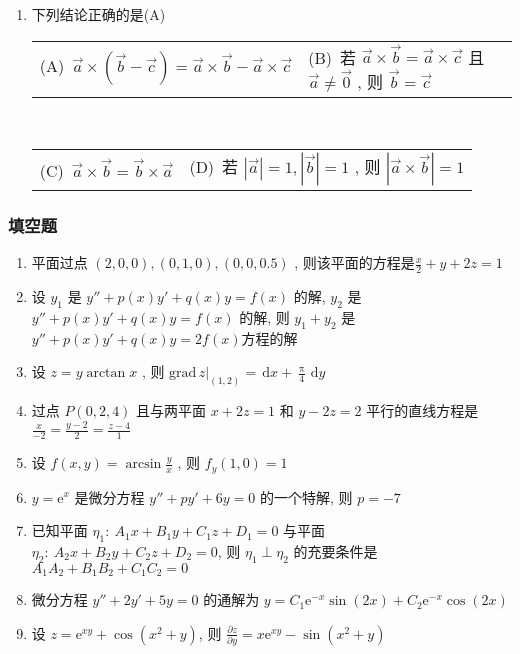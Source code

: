 \documentclass[cn,11pt,fancy,hide]{elegantbook}
\makeatletter
\newcommand{\ee}{\mathrm{e}}
\newcommand{\dd}{\,\mathrm{d}}
\newcommand{\twoch}[4]{\\\begin{tabular}{*{2}{@{}p{8cm}}}(A)~#1 & (B)~#2\end{tabular}\\\begin{tabular}{*{2}{@{}p{8cm}}}(C)~#3 & (D)~#4\end{tabular}}  %
\makeatother
\begin{document}
\begin{enumerate}
	\twoch{$2y\left(1+x^3\right)\ee^{x^2y}$}{$\ee^{x^2y}$}{$2x\left(1+x^2y\right)\ee^{x^2y}$}{$2x\ee^{x^2y}$}
	\item 下列结论正确的是(\hspace{0.25pc}A\hspace{0.25pc})
	\twoch{$\vec{a}\times\left(\vec{b}-\vec{c}\right)=\vec{a}\times\vec{b}-\vec{a}\times\vec{c}$}{若 $\vec{a}\times\vec{b}=\vec{a}\times\vec{c}$ 且 $\vec{a}\ne\vec{0}$ , 则 $\vec{b}=\vec{c}$}{$\vec{a}\times\vec{b}=\vec{b}\times\vec{a}$}{若 $\left|\vec{a}\right|=1,\left|\vec{b}\right|=1$ , 则 $\left|\vec{a}\times\vec{b}\right|=1$}
\end{enumerate}

\subsubsection{填空题}
\begin{enumerate}
	\item 平面过点 $(2,0,0),(0,1,0),(0,0,0.5)$ , 则该平面的方程是\underline{\hspace{1pc}$\frac{x}{2}+y+2z=1$\hspace{1pc}}
	\item 设 $y_1$ 是 $y''+p(x)y'+q(x)y=f(x)$ 的解, $y_2$ 是 $y''+p(x)y'+q(x)y=f(x)$ 的解, 则 $y_1+y_2$ 是\underline{\hspace{1pc}$y''+p(x)y'+q(x)y=2f(x)$\hspace{1pc}}方程的解
	\item 设 $z=y\arctan x$ , 则 $\left.\mathrm{grad}\,z\right|_{(1,2)}=$\underline{\hspace{1pc}$\dd x+\frac{\uppi}{4}\dd y$\hspace{1pc}}
	\item 过点 $P(0,2,4)$ 且与两平面 $x+2z=1$ 和 $y-2z=2$ 平行的直线方程是\underline{\hspace{1pc}$\frac{x}{-2}=\frac{y-2}{2}=\frac{z-4}{1}$\hspace{1pc}}
	\item 设 $f(x,y)=\arcsin\frac{y}{x}$ , 则 $f_y(1,0)=$\underline{\hspace{1pc}$1$\hspace{1pc}}
	\item $y=\ee^x$ 是微分方程 $y''+py'+6y=0$ 的一个特解, 则 $p=$\underline{\hspace{1pc}$-7$\hspace{1pc}}
	\item 已知平面 $\eta_1:\ A_1x+B_1y+C_1z+D_1=0$ 与平面 $\eta_2:\ A_2x+B_2y+C_2z+D_2=0$, 则 $\eta_1\perp\eta_2$ 的充要条件是\underline{\hspace{1pc}$A_1A_2+B_1B_2+C_1C_2=0$\hspace{1pc}}
	\item 微分方程 $y''+2y'+5y=0$ 的通解为 $y=$\underline{\hspace{1pc}$C_1\ee^{-x}\sin(2x)+C_2\ee^{-x}\cos(2x)$\hspace{1pc}}
	\item 设 $z=\ee^{xy}+\cos\left(x^2+y\right)$, 则 $\frac{\partial z}{\partial y}=$\underline{\hspace{1pc}$x\ee^{xy}-\sin\left(x^2+y\right)$\hspace{1pc}}
\end{enumerate}
\end{document}
